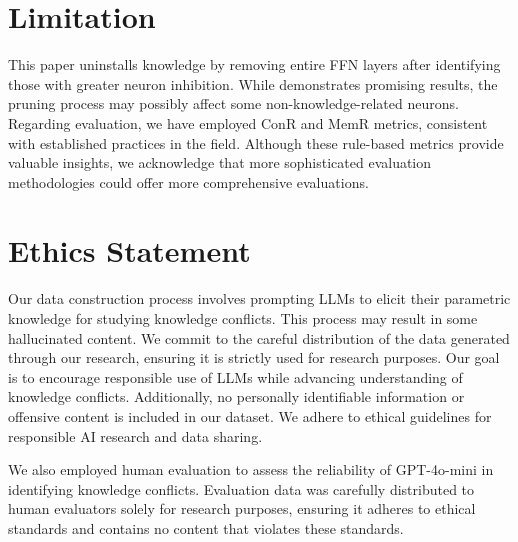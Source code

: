 \section*{Limitation}
This paper uninstalls knowledge by removing entire FFN layers after identifying those with greater neuron inhibition. While \method{} demonstrates promising results, the pruning process may possibly affect some non-knowledge-related neurons. Regarding evaluation, we have employed ConR and MemR metrics, consistent with established practices in the field. Although these rule-based metrics provide valuable insights, we acknowledge that more sophisticated evaluation methodologies could offer more comprehensive evaluations. 

\section*{Ethics Statement}
Our data construction process involves prompting LLMs to elicit their parametric knowledge for studying knowledge conflicts. This process may result in some hallucinated content. We commit to the careful distribution of the data generated through our research, ensuring it is strictly used for research purposes. Our goal is to encourage responsible use of LLMs while advancing understanding of knowledge conflicts. Additionally, no personally identifiable information or offensive content is included in our dataset. We adhere to ethical guidelines for responsible AI research and data sharing.

We also employed human evaluation to assess the reliability of GPT-4o-mini in identifying knowledge conflicts. Evaluation data was carefully distributed to human evaluators solely for research purposes, ensuring it adheres to ethical standards and contains no content that violates these standards.
